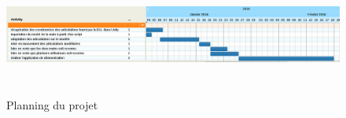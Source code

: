 \begin{figure}[!h]
  \begin{center}
    \includegraphics[width=18cm, height=4cm]{images/planning.png}
    \caption{Planning du projet}
    \label{fig:planning}
  \end{center}
\end{figure}
